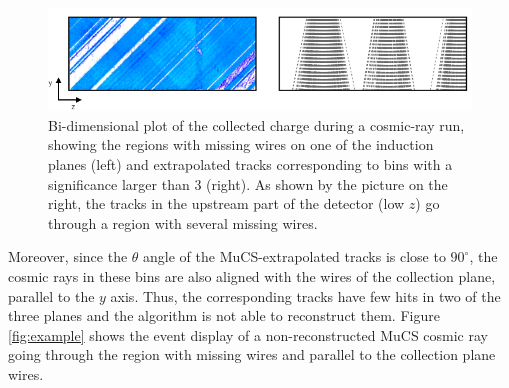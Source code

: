 \documentclass[a4paper,11pt]{article}
\begin{document}
\begin{figure}[htbp]
  \begin{center}
    \includegraphics[width=1\linewidth]{figures/wire_tracks.png}
    \caption{Bi-dimensional plot of the collected charge during a cosmic-ray run, showing the regions with missing wires on one of the induction planes (left) and extrapolated tracks corresponding to bins with a significance larger than 3 (right). As shown by the picture on the right, the tracks in the upstream part of the detector (low $z$) go through a region with several missing wires.} \label{fig:wires}
  \end{center}
\end{figure}


Moreover, since the $\theta$ angle of the MuCS-extrapolated tracks is close to $90^\circ$, the cosmic rays in these bins are also aligned with the wires of the collection plane, parallel to the $y$ axis. Thus, the corresponding tracks have few hits in two of the three planes and the algorithm is not able to reconstruct them. Figure \ref{fig:example} shows the event display of a non-reconstructed MuCS cosmic ray going through the region with missing wires and parallel to the collection plane wires.
\end{document}
